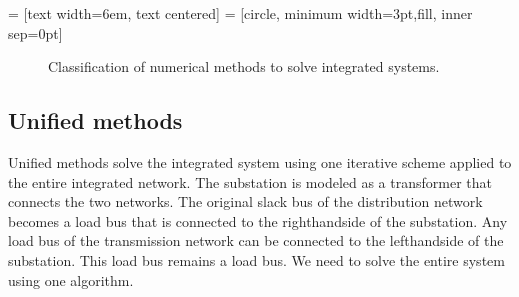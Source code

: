 \documentclass[10pt,journal]{article}
\begin{document}
 = [text width=6em, text centered]
 = [circle, minimum width=3pt,fill, inner sep=0pt]
\begin{figure}[h]
\caption{Classification of numerical methods to solve integrated systems.}
\label{fig:algorithms}
\end{figure}

\subsection{Unified methods}
\noindent Unified methods solve the integrated system using one iterative scheme applied to the entire integrated network. The substation is modeled as a transformer that connects the two networks. The original slack bus of the distribution network becomes a load bus that is connected to the righthandside of the substation. Any load bus of the transmission network can be connected to the lefthandside of the substation. This load bus remains a load bus. We need to solve the entire system using one algorithm. 
\end{document}
